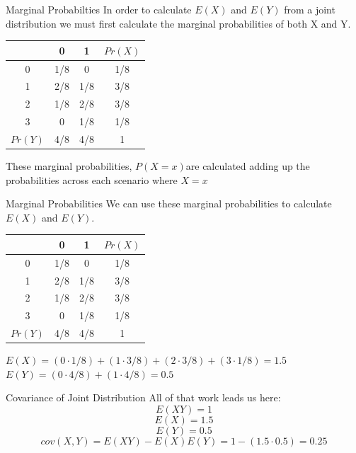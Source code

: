 \documentclass{beamer}
\begin{document}
\begin{frame}{Marginal Probabilties}
	In order to calculate $E(X)$ and $E(Y)$ from a joint distribution we must first calculate the \alert{marginal probabilities} of both X and Y. 
	\begin{center}
		\begin{tabular}{|c|c|c|c|}
			\hline
			\diagbox{$X$}{$Y$} & 0   & 1   & $Pr(X)$ \\
			\hline
			0                       & 1/8 & 0   & 1/8     \\
			\hline
			1                       & 2/8 & 1/8 & 3/8     \\
			\hline
			2                       & 1/8 & 2/8 & 3/8     \\
			\hline
			3                       & 0   & 1/8 & 1/8     \\
			\hline
			$Pr(Y)$                 & 4/8 & 4/8 & 1       \\
			\hline
		\end{tabular}
	\end{center}
	These marginal probabilities, $P(X=x) $are calculated adding up the probabilities across each scenario where $X=x$
\end{frame}

\begin{frame}{Marginal Probabilities}
	We can use these marginal probabilities to calculate $E(X)$ and $E(Y)$.
	\begin{center}
		\begin{tabular}{|c|c|c|c|}
			\hline
			\diagbox{$X$}{$Y$} & 0   & 1   & $Pr(X)$ \\
			\hline
			0                       & 1/8 & 0   & 1/8     \\
			\hline
			1                       & 2/8 & 1/8 & 3/8     \\
			\hline
			2                       & 1/8 & 2/8 & 3/8     \\
			\hline
			3                       & 0   & 1/8 & 1/8     \\
			\hline
			$Pr(Y)$                 & 4/8 & 4/8 & 1       \\
			\hline
		\end{tabular}
	\end{center}
	$E(X)=(0 \cdot 1/8) + (1 \cdot 3/8) + (2 \cdot 3/8) + (3 \cdot 1/8) =1.5$
	$E(Y)=(0 \cdot 4/8) + (1 \cdot 4/8) =0.5$
\end{frame}

\begin{frame}{Covariance of Joint Distribution}
	All of that work leads us here:
	$$E(XY)=1$$
	$$E(X)= 1.5 $$
	$$E(Y)= 0.5$$
	$$cov(X,Y)=E(XY)-E(X)E(Y) =1 - (1.5 \cdot 0.5) = 0.25$$
\end{frame}
\end{document}
